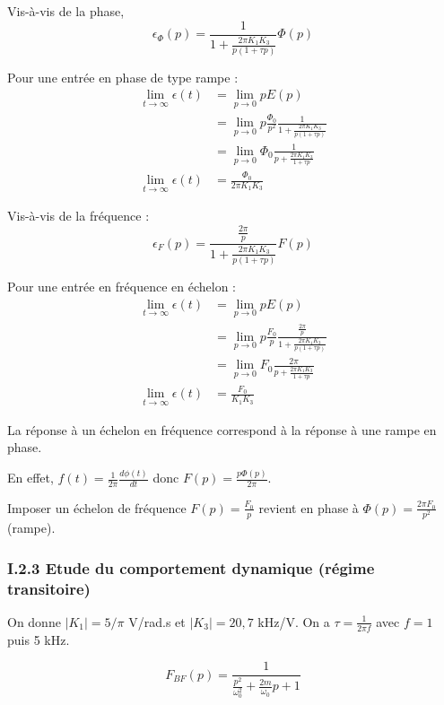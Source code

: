 \documentclass[../../Cours_M1.tex]{subfiles}
\begin{document}
\begin{multicols}{2}
Vis-à-vis de la phase,
\[ \epsilon_{\Phi}(p) = \frac{1}{1+\frac{2\pi K_1 K_3}{p(1+\tau p)}} \Phi(p) \]

Pour une entrée en phase de type rampe :
\begin{align*}
\lim_{t\rightarrow\infty} \epsilon(t) & = \lim_{p\rightarrow 0} pE(p) \\
& = \lim_{p\rightarrow 0} p \frac{\Phi_0}{p^2} \frac{1}{1+\frac{2\pi K_1 K_3}{p(1+\tau p)}} \\
& = \lim_{p\rightarrow 0} \Phi_0 \frac{1}{p+\frac{2\pi K_1 K_3}{1+\tau p}} \\
\lim_{t\rightarrow\infty} \epsilon(t) & = \frac{\Phi_0}{2\pi K_1 K_3}
\end{align*}


Vis-à-vis de la fréquence :
\[ \epsilon_F(p) = \frac{\frac{2\pi}{p}}{1+\frac{2\pi K_1 K_3}{p(1+\tau p)}} F(p) \]

Pour une entrée en fréquence en échelon :
\begin{align*}
\lim_{t\rightarrow\infty} \epsilon(t) & = \lim_{p\rightarrow 0} pE(p) \\
& = \lim_{p\rightarrow 0} p \frac{F_0}{p} \frac{\frac{2\pi}{p}}{1+\frac{2\pi K_1 K_3}{p(1+\tau p)}} \\
& = \lim_{p\rightarrow 0} F_0 \frac{2\pi}{p+\frac{2\pi K_1 K_3}{1+\tau p}} \\
\lim_{t\rightarrow\infty} \epsilon(t) & = \frac{F_0}{K_1K_3}
\end{align*}
\end{multicols}

La réponse à un échelon en fréquence correspond à la réponse à une rampe en phase.

En effet, $f(t) = \frac{1}{2\pi} \frac{d\phi(t)}{dt}$ donc $F(p) = \frac{p \Phi(p)}{2\pi}$.

Imposer un échelon de fréquence $F(p) = \frac{F_0}{p}$ revient en phase à $\Phi(p) = \frac{2\pi F_0}{p^2}$ (rampe).\\

\subsubsection*{I.2.3 Etude du comportement dynamique (régime transitoire)}

On donne $|K_1| = 5/\pi$ V/rad.s et $|K_3| = 20,7$ kHz/V. On a $\tau = \frac{1}{2\pi f}$ avec $f = 1 $ puis 5 kHz.

\[F_{BF}(p) = \frac{1}{\frac{p^2}{\omega_0^2}+\frac{2m}{\omega_0}p +1}\]
\end{document}

